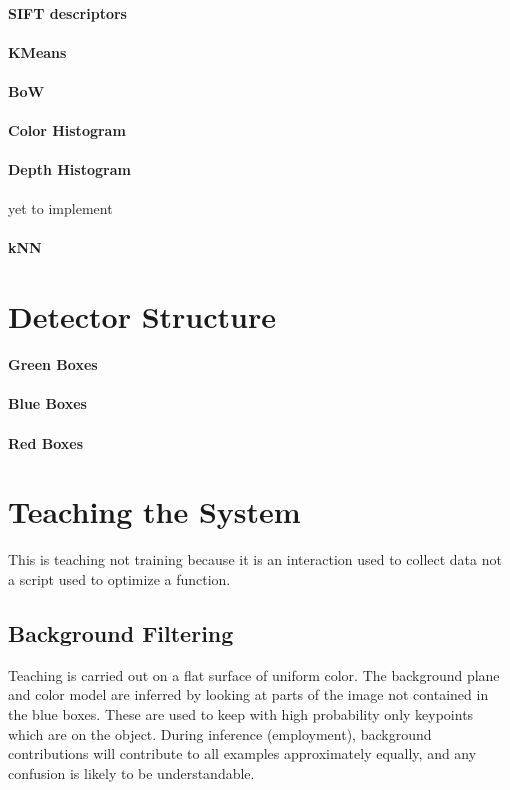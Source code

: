 \documentclass[12pt]{article}
\numberwithin{equation}{section}
\numberwithin{table}{section}
\numberwithin{figure}{section}
\begin{document}
\paragraph{SIFT descriptors}
\paragraph{KMeans}
\paragraph{BoW}
\paragraph{Color Histogram}
\paragraph{Depth Histogram}yet to implement
\paragraph{kNN}

\section{Detector Structure}
\paragraph{Green Boxes}
\paragraph{Blue Boxes}
\paragraph{Red Boxes}

\section{Teaching the System}
This is teaching not training because it is an interaction used to collect
data not a script used to optimize a function.

\subsection{Background Filtering}
Teaching is carried out on a flat surface of uniform color. The background plane
and color model are inferred by looking at parts of the image not contained in
the blue boxes. These are used to keep with high probability only keypoints which
are on the object. During inference (employment), background contributions will
contribute to all examples approximately equally, and any confusion is likely to
be understandable.
\end{document}
